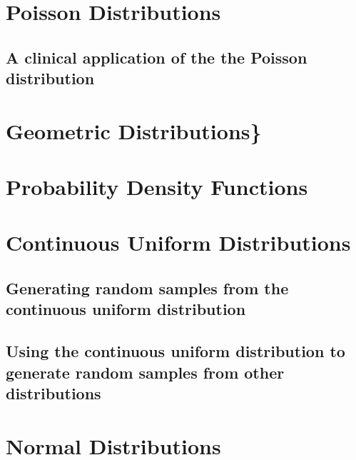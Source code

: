 \documentclass[
]{book}
\begin{document}
\hypertarget{poisson-distributions}{%
\section{Poisson Distributions}\label{poisson-distributions}}

\hypertarget{a-clinical-application-of-the-the-poisson-distribution}{%
\subsection{A clinical application of the the Poisson distribution}\label{a-clinical-application-of-the-the-poisson-distribution}}

\hypertarget{geometric-distributions}{%
\section{Geometric Distributions\}}\label{geometric-distributions}}

\hypertarget{sec:pdf}{%
\section{Probability Density Functions}\label{sec:pdf}}

\hypertarget{sec:Uniform}{%
\section{Continuous Uniform Distributions}\label{sec:Uniform}}

\hypertarget{generating-random-samples-from-the-continuous-uniform-distribution}{%
\subsection{Generating random samples from the continuous uniform distribution}\label{generating-random-samples-from-the-continuous-uniform-distribution}}

\hypertarget{using-the-continuous-uniform-distribution-to-generate-random-samples-from-other-distributions}{%
\subsection{Using the continuous uniform distribution to generate random samples from other distributions}\label{using-the-continuous-uniform-distribution-to-generate-random-samples-from-other-distributions}}

\hypertarget{sec:normal}{%
\section{Normal Distributions}\label{sec:normal}}
\end{document}
